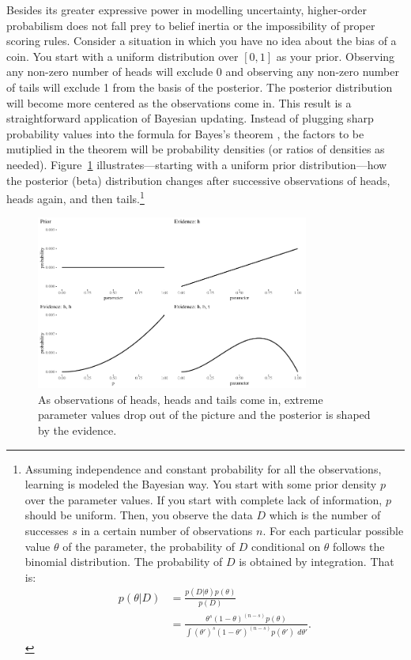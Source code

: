 \documentclass[
  letterpaper,
  DIV=11,
  numbers=noendperiod]{scrartcl}
\begin{document}
Besides its greater expressive power in modelling uncertainty,
higher-order probabilism does not fall prey to belief inertia or the
impossibility of proper scoring rules. Consider a situation in which you
have no idea about the bias of a coin. You start with a uniform
distribution over \([0,1]\) as your prior. Observing any non-zero number
of heads will exclude 0 and observing any non-zero number of tails will
exclude 1 from the basis of the posterior. The posterior distribution
will become more centered as the observations come in. This result is a
straightforward application of Bayesian updating. Instead of plugging
sharp probability values into the formula for Bayes's theorem , the
factors to be mutiplied in the theorem will be probability densities (or
ratios of densities as needed). Figure~\ref{fig-intertia2}
illustrates---starting with a uniform prior distribution---how the
posterior (beta) distribution changes after successive observations of
heads, heads again, and then tails.\footnote{Assuming independence and
  constant probability for all the observations, learning is modeled the
  Bayesian way. You start with some prior density \(p\) over the
  parameter values. If you start with complete lack of information,
  \(p\) should be uniform. Then, you observe the data \(D\) which is the
  number of successes \(s\) in a certain number of observations \(n\).
  For each particular possible value \(\theta\) of the parameter, the
  probability of \(D\) conditional on \(\theta\) follows the binomial
  distribution. The probability of \(D\) is obtained by integration.
  That is: \begin{align*}
  p(\theta \vert D) & = \frac{p(D\vert \theta)p(\theta)}{p(D)}\\
  & = \frac{\theta^s (1-\theta)^{(n - s)}p(\theta)}{\int (\theta')^s (1-\theta')^{(n - s)}p(\theta')\,\, d\theta'}.
  \end{align*}}

\begin{figure}

{\centering \includegraphics[width=0.8\textwidth,height=\textheight]{imp_philosophical_files/figure-pdf/fig-intertia2-1.pdf}

}

\caption{\label{fig-intertia2}As observations of heads, heads and tails
come in, extreme parameter values drop out of the picture and the
posterior is shaped by the evidence.}

\end{figure}
\end{document}
